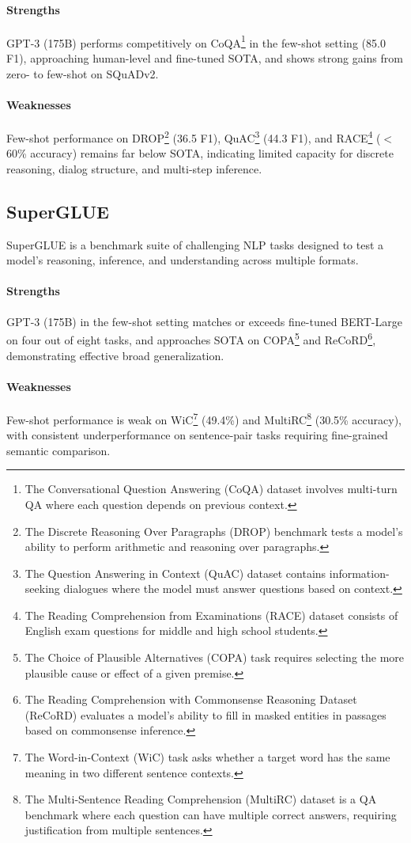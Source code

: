\documentclass[10pt]{article}
\begin{document}
\paragraph{Strengths}
GPT-3 (175B) performs competitively on CoQA\footnote{The Conversational Question Answering (CoQA) dataset involves multi-turn QA where each question depends on previous context.} in the few-shot setting (85.0 F1), approaching human-level and fine-tuned SOTA, and shows strong gains from zero- to few-shot on SQuADv2.

\paragraph{Weaknesses}
Few-shot performance on DROP\footnote{The Discrete Reasoning Over Paragraphs (DROP) benchmark tests a model's ability to perform arithmetic and reasoning over paragraphs.} (36.5 F1), QuAC\footnote{The Question Answering in Context (QuAC) dataset contains information-seeking dialogues where the model must answer questions based on context.} (44.3 F1), and RACE\footnote{The Reading Comprehension from Examinations (RACE) dataset consists of English exam questions for middle and high school students.} (\(<\) 60\% accuracy) remains far below SOTA, indicating limited capacity for discrete reasoning, dialog structure, and multi-step inference.


\subsection*{SuperGLUE}
SuperGLUE is a benchmark suite of challenging NLP tasks designed to test a model's reasoning, inference, and understanding across multiple formats.

\paragraph{Strengths}
GPT-3 (175B) in the few-shot setting matches or exceeds fine-tuned BERT-Large on four out of eight tasks, and approaches SOTA on COPA\footnote{The Choice of Plausible Alternatives (COPA) task requires selecting the more plausible cause or effect of a given premise.} and ReCoRD\footnote{The Reading Comprehension with Commonsense Reasoning Dataset (ReCoRD) evaluates a model's ability to fill in masked entities in passages based on commonsense inference.}, demonstrating effective broad generalization.

\paragraph{Weaknesses}
Few-shot performance is weak on WiC\footnote{The Word-in-Context (WiC) task asks whether a target word has the same meaning in two different sentence contexts.} (49.4\%) and MultiRC\footnote{The Multi-Sentence Reading Comprehension (MultiRC) dataset is a QA benchmark where each question can have multiple correct answers, requiring justification from multiple sentences.} (30.5\% accuracy), with consistent underperformance on sentence-pair tasks requiring fine-grained semantic comparison.
\end{document}

